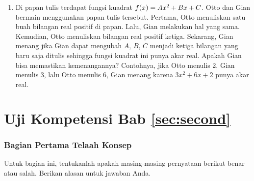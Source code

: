 \begin{enumerate}[topsep=0pt]
			\item {} \probtype{*} Di papan tulis terdapat fungsi kuadrat $ \mathop{}\!{f}{\left({x}\right)} = Ax^{2} + Bx + C $. Otto dan Gian bermain menggunakan papan tulis tersebut. Pertama, Otto menuliskan satu buah bilangan real positif di papan. Lalu, Gian melakukan hal yang sama. Kemudian, Otto menuliskan bilangan real positif ketiga. Sekarang, Gian menang jika Gian dapat mengubah $ A $, $ B $, $ C $ menjadi ketiga bilangan yang baru saja ditulis sehingga fungsi kuadrat ini punya akar real. Apakah Gian bisa memastikan kemenangannya? Contohnya, jika Otto menulis 2, Gian menulis 3, lalu Otto menulis 6, Gian menang karena $ 3x^{2} + 6x + 2 $ punya akar real.
		\end{enumerate}

\newpage


\section{Uji Kompetensi Bab \ref{sec:second}}

\subsubsection{Bagian Pertama \dashh Telaah Konsep}
	
	Untuk bagian ini, tentukanlah apakah masing-masing pernyataan berikut benar atau salah. Berikan alasan untuk jawaban Anda.
	
